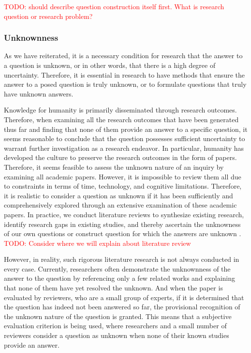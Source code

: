 \documentclass{book}
\begin{document}
\textcolor{red}{TODO: should describe question construction itself first. What is research question or research problem?}

\subsubsection{Unknownness}
As we have reiterated, it is a necessary condition for research that the answer to a question is unknown, or in other words, that there is a high degree of uncertainty. Therefore, it is essential in research to have methods that ensure the answer to a posed question is truly unknown, or to formulate questions that truly have unknown answers.

Knowledge for humanity is primarily disseminated through research outcomes. Therefore, when examining all the research outcomes that have been generated thus far and finding that none of them provide an answer to a specific question, it seems reasonable to conclude that the question possesses sufficient uncertainty to warrant further investigation as a research endeavor. In particular, humanity has developed the culture to preserve the research outcomes in the form of papers. Therefore, it seems feasible to assess the unknown nature of an inquiry by examining all academic papers. However, it is impossible to review them all due to constraints in terms of time, technology, and cognitive limitations. Therefore, it is realistic to consider a question as unknown if it has been sufficiently and comprehensively explored through an extensive examination of these academic papers. In practice, we conduct literature reviews to synthesize existing research, identify research gaps in existing studies, and thereby ascertain the unknowness of our own questions or construct question for which the answers are unknown \cite{schryen2015theory}. \textcolor{red}{TODO: Consider where we will explain about literature review}


However, in reality, such rigorous literature research is not always conducted in every case. Currently, researchers often demonstrate the unknownness of the answer to the question by referencing only a few related works and explaining that none of them have yet resolved the unknown. And when the paper is evaluated by reviewers, who are a small group of experts, if it is determined that the question has indeed not been answered so far, the provisional recognition of the unknown nature of the question is granted. This means that a subjective evaluation criterion is being used, where researchers and a small number of reviewers consider a question as unknown when none of their known studies provide an answer.
\end{document}
